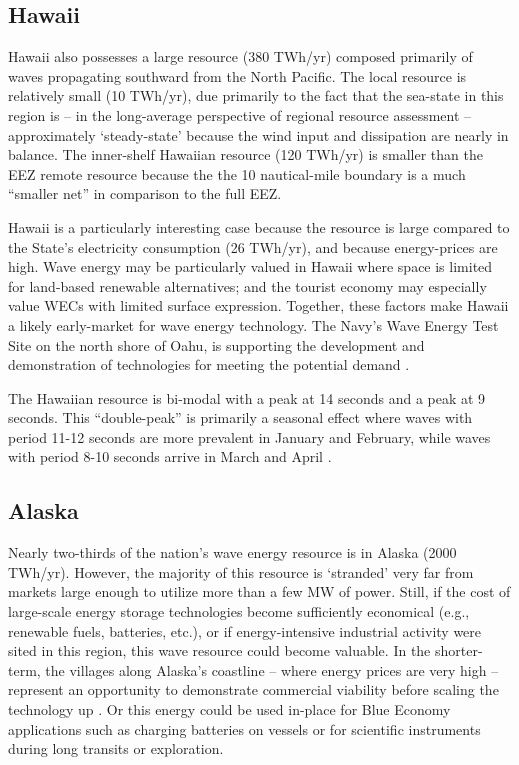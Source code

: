 \subsection{Hawaii}

Hawaii also possesses a large resource (380 TWh/yr) composed primarily of waves propagating southward from the North Pacific. The local resource is relatively small (10 TWh/yr), due primarily to the fact that the sea-state in this region is -- in the long-average perspective of regional resource assessment -- approximately `steady-state' because the wind input and dissipation are nearly in balance. The inner-shelf Hawaiian resource (120 TWh/yr) is smaller than the EEZ remote resource because the the 10 nautical-mile boundary is a much ``smaller net'' in comparison to the full EEZ.

Hawaii is a particularly interesting case because the resource is large compared to the State's electricity consumption (26 TWh/yr), and because energy-prices are high. Wave energy may be particularly valued in Hawaii where space is limited for land-based renewable alternatives; and the tourist economy may especially value WECs with limited surface expression. Together, these factors make Hawaii a likely early-market for wave energy technology. The Navy's Wave Energy Test Site on the north shore of Oahu, is supporting the development and demonstration of technologies for meeting the potential demand \citep{crossEarlyResearchEfforts2015}.

The Hawaiian resource is bi-modal with a peak at 14 seconds and a peak at 9 seconds. This ``double-peak'' is primarily a seasonal effect where waves with period 11-12 seconds are more prevalent in January and February, while waves with period 8-10 seconds arrive in March and April \citep[][]{stopa2013wave}. 

\subsection{Alaska}

Nearly two-thirds of the nation's wave energy resource is in Alaska (2000 TWh/yr). However, the majority of this resource is `stranded' very far from markets large enough to utilize more than a few MW of power. Still, if the cost of large-scale energy storage technologies become sufficiently economical (e.g., renewable fuels, batteries, etc.), or if energy-intensive industrial activity were sited in this region, this wave resource could become valuable. In the shorter-term, the villages along Alaska's coastline -- where energy prices are very high -- represent an opportunity to demonstrate commercial viability before scaling the technology up \cite{alaskaenergyauthority2019PowerCost2020}. Or this energy could be used in-place for Blue Economy applications such as charging batteries on vessels or for scientific instruments during long transits or exploration. 

